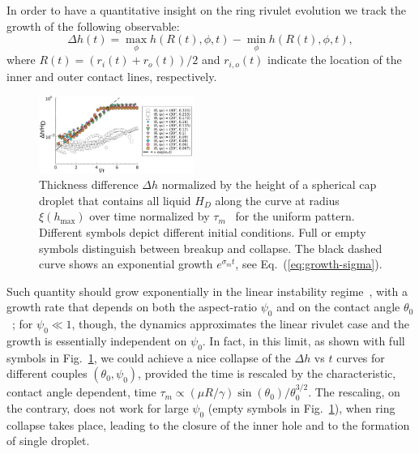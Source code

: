 \documentclass[twoside,twocolumn,9pt]{article}
\begin{document}
In order to have a quantitative insight on the ring rivulet evolution we track the growth of the following 
observable:
\begin{equation}\label{eq:delta-h-measure}
       \Delta h(t) = \max_{\phi}h(R(t),\phi,t) - \min_{\phi}h(R(t),\phi,t),
\end{equation}
where $R(t) = (r_i(t)+r_o(t))/2$ and $r_{i,o}(t)$ indicate the location of the inner and outer contact lines, 
respectively. 

\begin{figure}
    \centering
    \includegraphics[width=0.45\textwidth]{assets/growth-breakup.pdf}
    \caption{Thickness difference $\Delta h$ normalized by the height of a spherical cap droplet that contains all liquid $H_D$ along the curve at radius $\xi(h_{\max})$ over time normalized by $\tau_{m}$~\cite{wuBreakupPatternedNanoscale2010} for the uniform pattern. 
    Different symbols depict different initial conditions. 
    Full or empty symbols distinguish between breakup and collapse. 
    The black dashed curve shows an exponential growth $e^{\sigma_m t}$, see Eq.~(\ref{eq:growth-sigma}).
    }
    \label{fig:first_growth}
\end{figure}
Such quantity should grow exponentially in the linear instability regime~\cite{wuBreakupPatternedNanoscale2010, gonzalezStabilityLiquidRing2013, nguyenCompetitionCollapseBreakup2012}, with a growth rate that depends on 
both the aspect-ratio $\psi_0$ and on the contact angle $\theta_0$~\cite{gonzalezStabilityLiquidRing2013}; for $\psi_0 \ll 1$, though, the dynamics approximates the 
linear rivulet case and the growth is essentially independent on $\psi_0$. In fact, in this limit, 
as shown with full symbols in Fig.~\ref{fig:first_growth}, we could achieve a nice collapse of the $\Delta h$ vs $t$ 
curves for different couples $(\theta_0,\psi_0)$, provided the time is rescaled by the characteristic, contact angle dependent, time 
$\tau_m \propto (\mu R/\gamma) \sin(\theta_0)/\theta_0^{3/2}$. 
The rescaling, on the contrary, does not work for large $\psi_0$ (empty symbols in Fig.~\ref{fig:first_growth}), when ring collapse takes place, leading to the closure of the inner hole 
and to the formation of single droplet.
\end{document}
